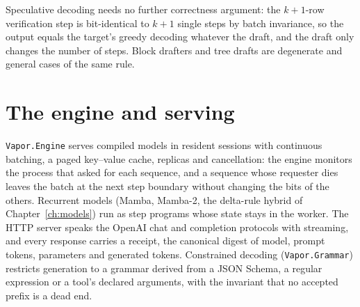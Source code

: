 Speculative decoding needs no further correctness argument: the $k{+}1$-row verification step is
bit-identical to $k{+}1$ single steps by batch invariance, so the output equals the target's greedy
decoding whatever the draft, and the draft only changes the number of steps. Block drafters and tree
drafts are degenerate and general cases of the same rule.

\section{The engine and serving}

\texttt{Vapor.Engine} serves compiled models in resident sessions with continuous batching, a paged
key--value cache, replicas and cancellation: the engine monitors the process that asked for each
sequence, and a sequence whose requester dies leaves the batch at the next step boundary without
changing the bits of the others. Recurrent models (Mamba, Mamba-2, the delta-rule hybrid of
Chapter~\ref{ch:models}) run as step programs whose state stays in the worker. The HTTP server speaks
the OpenAI chat and completion protocols with streaming, and every response carries a receipt, the
canonical digest of model, prompt tokens, parameters and generated tokens. Constrained decoding
(\texttt{Vapor.Grammar}) restricts generation to a grammar derived from a JSON Schema, a regular
expression or a tool's declared arguments, with the invariant that no accepted prefix is a dead end.
